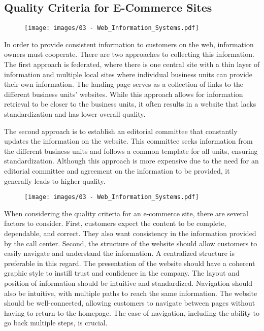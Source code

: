 \subsection{Quality Criteria for E-Commerce
  Sites}\label{quality-criteria-for-e-commerce-sites}


\begin{figure}[!h]
  \centering
  \texttt{[image: images/03 - Web\_Information\_Systems.pdf]}
\end{figure}

In order to provide consistent information to customers on the web,
information owners must cooperate. There are two approaches to
collecting this information. The first approach is federated, where
there is one central site with a thin layer of information and multiple
local sites where individual business units can provide their own
information. The landing page serves as a collection of links to the
different business units' websites. While this approach allows for
information retrieval to be closer to the business units, it often
results in a website that lacks standardization and has lower overall
quality.

The second approach is to establish an editorial committee that
constantly updates the information on the website. This committee seeks
information from the different business units and follows a common
template for all units, ensuring standardization. Although this approach
is more expensive due to the need for an editorial committee and
agreement on the information to be provided, it generally leads to
higher quality.

\begin{figure}[!h]
  \centering
  \texttt{[image: images/03 - Web\_Information\_Systems.pdf]}
\end{figure}

When considering the quality criteria for an e-commerce site, there are
several factors to consider. First, customers expect the content to be
complete, dependable, and correct. They also want consistency in the
information provided by the call center. Second, the structure of the
website should allow customers to easily navigate and understand the
information. A centralized structure is preferable in this regard. The
presentation of the website should have a coherent graphic style to
instill trust and confidence in the company. The layout and position of
information should be intuitive and standardized. Navigation should also
be intuitive, with multiple paths to reach the same information. The
website should be well-connected, allowing customers to navigate between
pages without having to return to the homepage. The ease of navigation,
including the ability to go back multiple steps, is crucial.

